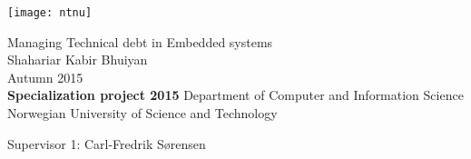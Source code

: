 
\thispagestyle{empty}
\texttt{[image: ntnu]}
\mbox{}\\[6pc]
\begin{center}
\Huge{Managing Technical debt in Embedded systems}\\[2pc]

\Large{Shahariar Kabir Bhuiyan}\\[1pc]
\large{Autumn 2015}\\[2pc]

\textbf{Specialization project 2015}
\linebreak
Department of Computer and Information Science\\
Norwegian University of Science and Technology
\end{center}
\vfill

\noindent Supervisor 1: Carl-Fredrik Sørensen

